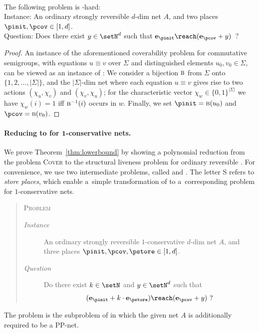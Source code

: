 \begin{prop}\label{prop:problemcover}
\hfill\\	
	The following problem \Cover is \EXPSPACE-hard:
\\
Instance: An ordinary strongly reversible $d$-dim net $A$, and two places
	$\pinit,\pcov\in[1,d]$.
\\
	Question: Does there exist $y\in\setN^d$ such that $\mathbf{e}_\pinit\reach
	(\mathbf{e}_\pcov+y)$~?
\end{prop}
\begin{proof}
An instance of the aforementioned coverability problem for
	commutative semigroups, with equations $u\equiv v$ over
	$\Sigma$ and distinguished elements
	$u_0,v_0\in\Sigma$,
	can be viewed as an instance of \Cover: We consider a
	bijection $\textsc{b}$ from $\Sigma$
onto $\{1,2,\dots,|\Sigma|\}$, and the
$|\Sigma|$-dim net where each equation $u\equiv v$ gives rise to two
	actions $(\chi_u,\chi_v)$ and $(\chi_v,\chi_u)$; for the
	characteristic vector
	$\chi_w\in \{0,1\}^{|\Sigma|}$ we have $\chi_w(i)=1$ iff
	$\textsc{b}^{-1}(i)$ occurs in $w$. Finally, we set
	$\pinit=\textsc{b}(u_0)$ and $\pcov=\textsc{b}(v_0)$.
\end{proof}	

\paragraph{Reducing \Cover to \SCover for $\bm{1}$-conservative nets.}
We prove Theorem~\ref{thm:lowerbound} by showing a polynomial
reduction from the problem \textsc{Cover} to
the structural liveness problem for ordinary reversible \ppnets. For convenience, we use two intermediate problems, called \SCover
and \PPSCover. The letter \textsc{S} refers to \emph{store places}, 
which enable a~simple transformation of \Cover to a~corresponding
problem for $1$-conservative nets. 

\begin{quote}
    \textsc{Problem} \SCover
    \smallskip
\begin{description}
        \item[\emph{Instance}]
An ordinary strongly reversible $1$-conservative $d$-dim net $A$, and
three places $\pinit,\pcov,\pstore\in[1,d]$.
 \item[\emph{Question}]
	Do there exist $k\in\setN$ and $y\in\setN^d$ such that 
		\[(\mathbf{e}_\pinit+k\cdot \mathbf{e}_\pstore)\reach
		(\mathbf{e}_\pcov+y)~?\]
 \end{description}
 \end{quote}
The problem \PPSCover is the subproblem of \SCover in which the given
net $A$ is additionally required to be a PP-net.

